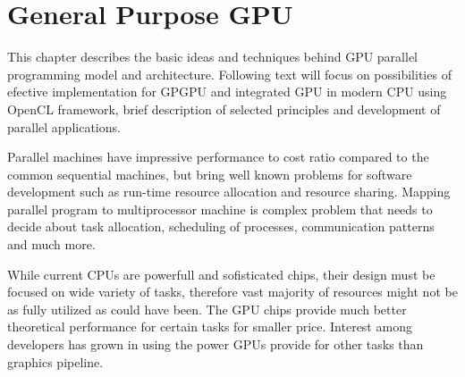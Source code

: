 


\chapter{General Purpose GPU}\label{chapter:gpgpu}
This chapter describes the basic ideas and techniques behind GPU parallel 
programming model and architecture. Following text will focus on possibilities
of efective implementation for GPGPU and integrated GPU in modern CPU using 
OpenCL framework, brief description of selected principles and development of
parallel applications. 

Parallel machines have impressive performance to cost ratio compared to the
common sequential machines\cite{Darlington93structuredparallel}, but bring well
known problems for software development such as run-time resource allocation
and resource sharing. Mapping parallel program to multiprocessor machine is
complex problem that needs to decide about task allocation, scheduling of
processes, communication patterns and much more.

While current CPUs are powerfull and sofisticated chips, their design must be
focused on wide variety of tasks, therefore vast majority of resources might
not be as fully utilized as could have been. The GPU chips provide much better
theoretical performance for certain tasks for smaller price\cite{Owens:2007:ASO}.
Interest among developers has grown in using the power GPUs provide for other
tasks than graphics pipeline. 

